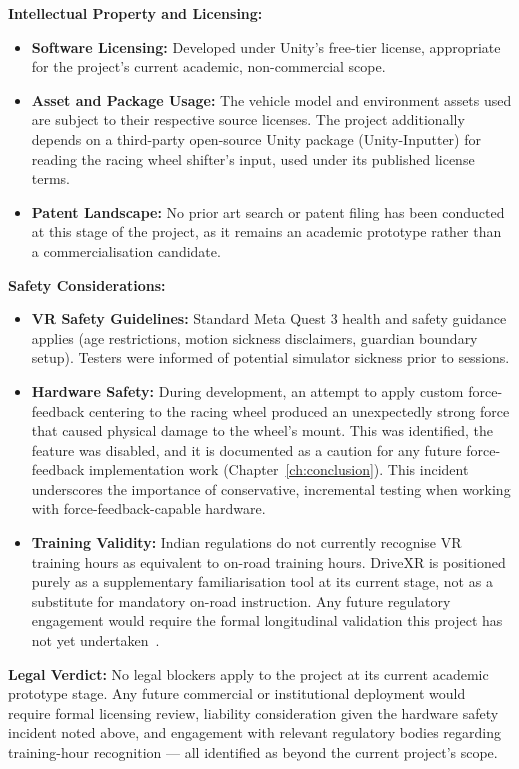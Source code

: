 \textbf{Intellectual Property and Licensing:}
\begin{itemize}
    \item \textbf{Software Licensing:} Developed under Unity's free-tier license, appropriate for the project's current academic, non-commercial scope.
    \item \textbf{Asset and Package Usage:} The vehicle model and environment assets used are subject to their respective source licenses. The project additionally depends on a third-party open-source Unity package (Unity-Inputter) for reading the racing wheel shifter's input, used under its published license terms.
    \item \textbf{Patent Landscape:} No prior art search or patent filing has been conducted at this stage of the project, as it remains an academic prototype rather than a commercialisation candidate.
\end{itemize}

\textbf{Safety Considerations:}
\begin{itemize}
    \item \textbf{VR Safety Guidelines:} Standard Meta Quest 3 health and safety guidance applies (age restrictions, motion sickness disclaimers, guardian boundary setup). Testers were informed of potential simulator sickness prior to sessions.
    \item \textbf{Hardware Safety:} During development, an attempt to apply custom force-feedback centering to the racing wheel produced an unexpectedly strong force that caused physical damage to the wheel's mount. This was identified, the feature was disabled, and it is documented as a caution for any future force-feedback implementation work (Chapter~\ref{ch:conclusion}). This incident underscores the importance of conservative, incremental testing when working with force-feedback-capable hardware.
    \item \textbf{Training Validity:} Indian regulations do not currently recognise VR training hours as equivalent to on-road training hours. DriveXR is positioned purely as a supplementary familiarisation tool at its current stage, not as a substitute for mandatory on-road instruction. Any future regulatory engagement would require the formal longitudinal validation this project has not yet undertaken~\cite{He2022}.
\end{itemize}

\textbf{Legal Verdict:} No legal blockers apply to the project at its current academic prototype stage. Any future commercial or institutional deployment would require formal licensing review, liability consideration given the hardware safety incident noted above, and engagement with relevant regulatory bodies regarding training-hour recognition — all identified as beyond the current project's scope.

